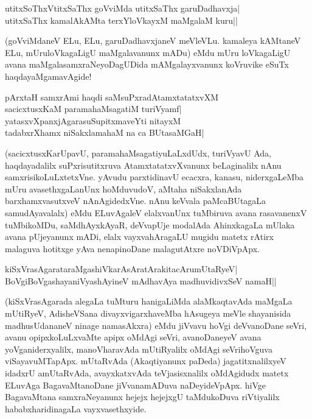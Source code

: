 \begin{shloka} 
utitxSoThxVtitxSaThx goVviMda utitxSaThx garuDadhavxja|\label{146}\\ 
utitxSaThx kamalAkAMta terxYloVkayxM maMgalaM kuru||
\end{shloka} 

(goVviMdaneV ELu, ELu, garuDadhavxjaneV meVleVLu. kamaleya kAMtaneV ELu, mUruloVkagaLigU maMgalavanunx mADu) eMdu mUru loVkagaLigU avana maMgalasamxraNeyoDagUDida mAMgalayxvanunx koVruvike eSuTx haqdayaMgamavAgide! 

\begin{shloka} 
pArxtaH samxrAmi haqdi saMsuPxradAtamxtatatxvXM\label{146a}\\ 
sacicxtusxKaM paramahaMsagatiM turiVyamf|\\ 
yatasxvXpanxjAgarasuSupitxmaveYti nitayxM\\ 
tadabxrXhamx niSakxlamahaM na ca BUtasaMGaH|
\end{shloka} 

(sacicxtusxKarUpavU, paramahaMsagatiyuLaLxdUdx, turiVyavU Ada, haqdayadalilx suPxrisutitxruva AtamxtatatxvXvanunx beLaginalilx nAnu samxrisikoLuLxtetxVne. yAvudu parxtidinavU ecacxra, kanasu, niderxgaLeMba mUru avasethxgaLanUnx hoMduvudoV, aMtaha niSakxlanAda barxhamxvasutxveV nAnAgidedxVne. nAnu keVvala paMcaBUtagaLa samudAyavalalx) eMdu ELuvAgaleV elalxvanUnx tuMbiruva avana rasavanenxV tuMbikoMDu, saMdhAyxkAyaR, deVvapUje modalAda AhinxkagaLa mUlaka avana pUjeyanunx mADi, elalx vayxvahAragaLU mugidu matetx rAtirx malaguva hotitxge yAva nenapinoDane malagutAtxre noVDiVpApx. 

\begin{shloka} 
kiSxVrasAgarataraMgashiVkarAsAratArakitacArumUtaRyeV|\label{147}\\
BoVgiBoVgashayaniVyashAyineV mAdhavAya madhuvidivxSeV namaH||
\end{shloka} 

(kiSxVrasAgarada alegaLa tuMturu hanigaLiMda alaMkaqtavAda maMgaLa mUtiRyeV, AdisheVSana divayxvigarxhaveMba hAsugeya meVle shayanisida madhusUdananeV ninage namasAkxra) eMdu jiVvavu hoVgi deVvanoDane seVri, avanu opipxkoLuLxvaMte apipx oMdAgi seVri, avanoDaneyeV avana yoVganiderxyalilx, manoVharavAda mUtiRyalilx oMdAgi seVrihoVguva viSayavuMTapApx. mUtaRvAda (Akaqtiyanunx paDeda) jagatitxnalilxyeV idadxrU amUtaRvAda, avayxkatxvAda teVjasisxnalilx oMdAgidudx matetx ELuvAga BagavaMtanoDane jiVvanamADuva naDeyideVpApx. hiVge BagavaMtana samxraNeyanunx hejejx hejejxgU taMdukoDuva riVtiyalilx hababxharidinagaLa vayxvasethxyide. 

